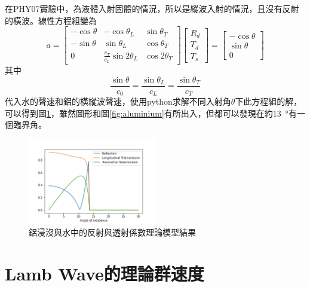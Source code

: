 \documentclass[12pt]{report}
\begin{document}
在PHY07實驗中，為液體入射固體的情況，所以是縱波入射的情況，且沒有反射的橫波。線性方程組變為    
    \begin{equation}
    a = \left[\begin{matrix}
    -\cos\theta  &  -\cos\theta_L  &  \sin\theta_T \\
    -\sin\theta  &  \sin\theta_L  &  \cos\theta_T \\
    0  &  \frac{c_T}{c_L}\sin 2\theta_L  &  \cos 2\theta_T
    \end{matrix}\right]
    \left[\begin{matrix}R_d\\T_d\\T_s\end{matrix}\right]
    =\left[\begin{matrix}-\cos\theta\\\sin\theta\\0\end{matrix}\right]
    \end{equation}
其中\begin{equation}
    \frac{\sin\theta}{c_0} = \frac{\sin\theta_L}{c_L} = \frac{\sin\theta_T}{c_T}
    \end{equation}
代入水的聲速和鋁的橫縱波聲速，使用python求解不同入射角$\theta$下此方程組的解，可以得到圖\ref{sim}，雖然圖形和圖\ref{fig:aluminium}有所出入，但都可以發現在約\SI{13}{\degree}有一個臨界角。
\begin{figure}[htbp]
    \centering
    \includegraphics[width=0.5\textwidth]{sim.png}
    \caption{鋁浸沒與水中的反射與透射係數理論模型結果}
    \label{sim}
\end{figure}

\section{Lamb Wave的理論群速度}
\end{document}
